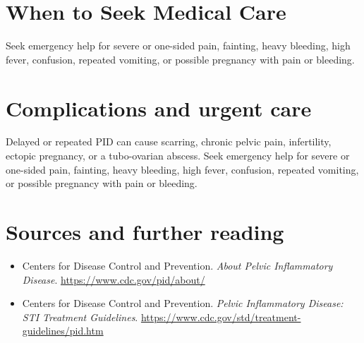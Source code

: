 \section*{When to Seek Medical Care}
Seek emergency help for severe or one-sided pain, fainting, heavy bleeding, high fever, confusion, repeated vomiting, or possible pregnancy with pain or bleeding.

\section*{Complications and urgent care}
Delayed or repeated PID can cause scarring, chronic pelvic pain, infertility, ectopic pregnancy, or a tubo-ovarian abscess. Seek emergency help for severe or one-sided pain, fainting, heavy bleeding, high fever, confusion, repeated vomiting, or possible pregnancy with pain or bleeding.

\section*{Sources and further reading}
\begin{itemize}
\item Centers for Disease Control and Prevention. \textit{About Pelvic Inflammatory Disease}. \url{https://www.cdc.gov/pid/about/}
\item Centers for Disease Control and Prevention. \textit{Pelvic Inflammatory Disease: STI Treatment Guidelines}. \url{https://www.cdc.gov/std/treatment-guidelines/pid.htm}
\end{itemize}
